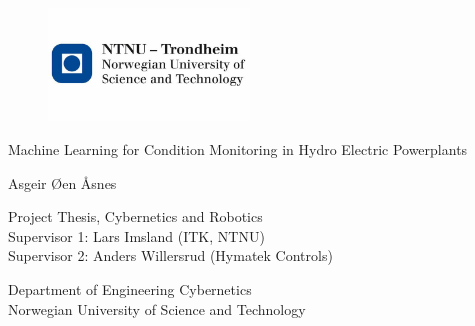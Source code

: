

\begin{flushleft}
\begin{figure}[t]
\includegraphics[height=3cm]{figures/ntnulogo.jpg}
\end{figure}


\LARGE{Machine Learning for Condition Monitoring}
\newline
\LARGE{in Hydro Electric Powerplants}

\vspace{3cm}
\Large{Asgeir Øen Åsnes}\\


\vspace{6cm}




\normalsize{Project Thesis, Cybernetics and Robotics\\
\noindent Supervisor 1: Lars Imsland (ITK, NTNU)\\
\noindent Supervisor 2: Anders Willersrud (Hymatek Controls)}
\vfill

\normalsize{Department of Engineering Cybernetics\\
Norwegian University of Science and Technology\\}
\end{flushleft}